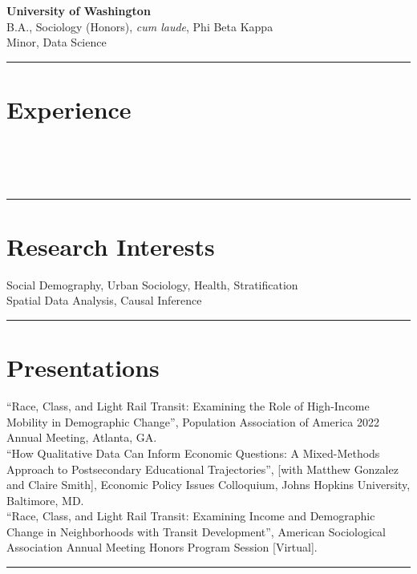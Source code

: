 \documentclass[11pt]{article} %
\begin{document}
 \smallskip
{} \textbf{University of Washington} \\
\textsc{B.A.}, Sociology (Honors), \emph{cum laude}, Phi Beta Kappa \\
Minor, Data Science \\
\noindent\rule{16cm}{0.4pt}

\section*{Experience}

 \\
  \\
\\
\noindent\rule{16cm}{0.4pt}

\section*{Research Interests}

\large{}Social Demography, Urban Sociology, Health, Stratification \\
\large{} Spatial Data Analysis, Causal Inference \\
\noindent\rule{16cm}{0.4pt}
\section*{Presentations}

   “Race, Class, and Light Rail Transit: Examining the Role of High-Income Mobility in Demographic Change”, Population Association of America 2022 Annual Meeting, Atlanta, GA. \\
 “How Qualitative Data Can Inform Economic Questions: A Mixed-Methods Approach to Postsecondary Educational Trajectories”, [with Matthew Gonzalez and Claire Smith], Economic Policy Issues Colloquium, Johns Hopkins University, Baltimore, MD. \\
   “Race, Class, and Light Rail Transit: Examining Income and Demographic Change in Neighborhoods with Transit Development”, American Sociological Association Annual Meeting Honors Program Session [Virtual]. \\
\noindent\rule{16cm}{0.4pt}
\end{document}
